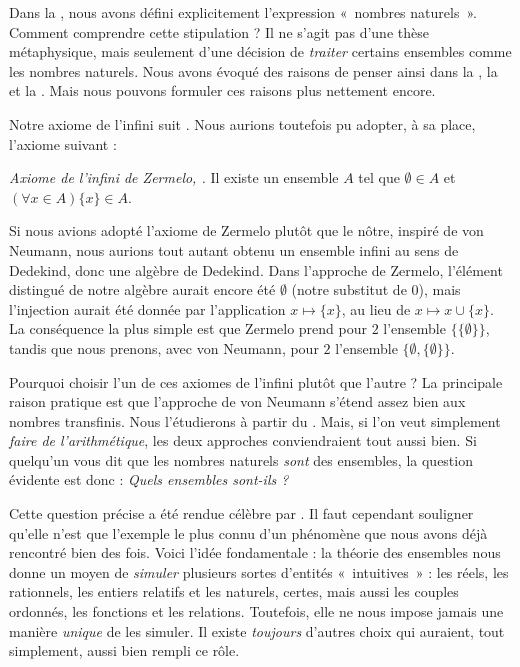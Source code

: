 \documentclass[../../../include/open-logic-section]{subfiles}
\begin{document}
	


Dans la , nous avons défini
explicitement l'expression «~nombres naturels~». Comment comprendre
cette stipulation ? Il ne s'agit pas d'une thèse métaphysique, mais
seulement d'une décision de \emph{traiter} certains ensembles comme
les nombres naturels. Nous avons évoqué des raisons de penser ainsi
dans la , la  et
la . Mais nous pouvons
formuler ces raisons plus nettement encore.

Notre axiome de l'infini suit \citet{VonNeumann1925}. Nous aurions
toutefois pu adopter, à sa place, l'axiome suivant :

\begin{defish}
\emph{Axiome de l'infini de Zermelo, \citeyear{Zermelo1908Untersuchungen}.}
Il existe un ensemble $A$ tel que $\emptyset \in A$ et
$(\forall x \in A)\{x\} \in A$.
\end{defish}

Si nous avions adopté l'axiome de Zermelo plutôt que le nôtre,
inspiré de von Neumann, nous aurions tout autant obtenu un ensemble
infini au sens de Dedekind, donc une algèbre de Dedekind. Dans
l'approche de Zermelo, l'élément distingué de notre algèbre aurait
encore été $\emptyset$ (notre substitut de $0$), mais l'injection
aurait été donnée par l'application $x \mapsto \{x\}$, au lieu de
$x \mapsto x \cup \{x\}$. La conséquence la plus simple est que
Zermelo prend pour $2$ l'ensemble $\{\{\emptyset\}\}$, tandis que
nous prenons, avec von Neumann, pour $2$ l'ensemble
$\{\emptyset, \{\emptyset\}\}$.

Pourquoi choisir l'un de ces axiomes de l'infini plutôt que l'autre ?
La principale raison pratique est que l'approche de von Neumann
s'étend assez bien aux nombres transfinis. Nous l'étudierons à partir
du . Mais, si l'on veut simplement
\emph{faire de l'arithmétique}, les deux approches conviendraient
tout aussi bien. Si quelqu'un vous dit que les nombres naturels
\emph{sont} des ensembles, la question évidente est donc :
\emph{Quels ensembles sont-ils ?}

Cette question précise a été rendue célèbre par \citet{Benacerraf1965}.
Il faut cependant souligner qu'elle n'est que l'exemple le plus connu
d'un phénomène que nous avons déjà rencontré bien des fois. Voici
l'idée fondamentale : la théorie des ensembles nous donne un moyen
de \emph{simuler} plusieurs sortes d'entités «~intuitives~» : les
réels, les rationnels, les entiers relatifs et les naturels, certes,
mais aussi les couples ordonnés, les fonctions et les relations.
Toutefois, elle ne nous impose jamais une manière \emph{unique} de
les simuler. Il existe \emph{toujours} d'autres choix qui auraient,
tout simplement, aussi bien rempli ce rôle.
\end{document}
